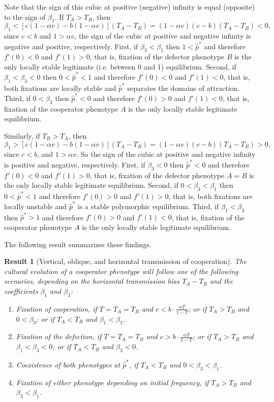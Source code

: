 \documentclass[12pt]{extarticle}
\newtheorem{result}{Result}
\begin{document}
{Note that the sign of this cubic at positive (negative) infinity is equal (opposite) to the sign of $\beta_1$. 
If $T_A>T_B$, then 
\begin{equation} \label{eq:beta1}
   \beta_1 < [c(1-\alpha v) - b(1-\alpha v)] (T_A-T_B) 
   = (1-\alpha v)(c-b)(T_A-T_B) < 0 ,
 \end{equation}
since $c<b$ and $1>\alpha v$, the sign of the cubic at positive and negative infinity is negative and positive, respectively.
First, if $\beta_3<\beta_1$ then 
$1<\hat{p}^*$ and therefore $f'(0)<0$ and $f'(1)>0$, that is, fixation of the defector phenotype $B$ is the only locally stable legitimate (i.e. between 0 and 1) equilibrium.
Second, if $\beta_1<\beta_3<0$ then 
$0<\hat{p}^*<1$ and therefore $f'(0)<0$ and $f'(1)<0$, that is, both fixations are locally stable and $\hat{p}^*$ separates the domains of attraction.
Third, if $0<\beta_3$ then 
$\hat{p}^*<0$ and therefore $f'(0)>0$ and $f'(1)<0$, that is, fixation of the cooperator phenotype $A$ is the only locally stable legitimate equilibrium.

Similarly, if $T_B>T_A$, then
\begin{equation} \label{eq:beta1_rev}
   \beta_1 > [c(1-\alpha v) - b(1-\alpha v)] (T_A-T_B) 
   = (1-\alpha v)(c-b)(T_A-T_B) > 0,
 \end{equation}
since $c<b$, and $1>\alpha v$. So the sign of the cubic at positive and negative infinity is positive and negative, respectively. 
First, if $\beta_3<0$ then $\hat{p}^*<0$ and therefore $f'(0)<0$ and $f'(1)>0$, that is, fixation of the defector phenotype $A=B$ is the only locally stable legitimate equilibrium.
Second, if $0<\beta_3<\beta_1$ then $0<\hat{p}^*<1$ and therefore $f'(0)>0$ and $f'(1)>0$, that is, both fixations are locally unstable and $\hat{p}^*$ is a stable polymorphic equilibrium.
Third, if $\beta_1<\beta_3$ then $\hat{p}^*>1$ and therefore $f'(0)>0$ and $f'(1)<0$, that is, fixation of the cooperator phenotype $A$ is the only locally stable legitimate equilibrium.

The following result summarizes these findings.

\begin{result}[Vertical, oblique, and horizontal transmission of cooperation] \label{result:vert_obli_hori}
The cultural evolution of a cooperator phenotype will follow one of the following scenarios, depending on the horizontal transmission bias $T_A-T_B$ and the coefficients $\beta_1$ and $\beta_3$:
\begin{enumerate}
\item \emph{Fixation of cooperation}, 
if $T=T_A=T_B$ and $c < b\cdot \frac{\alpha T}{1-T}$; or
if $T_A>T_B$ and $0<\beta_3$; or 
if $T_A<T_B$ and $\beta_1<\beta_3$.
\item \emph{Fixation of the defection}, 
if $T=T_A=T_B$ and $c > b\cdot \frac{\alpha T}{1-T}$; or 
if $T_A>T_B$ and $\beta_1<\beta_3<0$; or 
if $T_A<T_B$ and $\beta_3<0$.
\item \emph{Coexistence of both phenotypes at $\hat{p}^*$},
if $T_A < T_B$ and $0<\beta_3<\beta_1$.
\item \emph{Fixation of either phenotype depending on initial frequency}, if $T_A>T_B$ and $\beta_3<\beta_1$.


\end{enumerate}
\end{result}}
\end{document}
